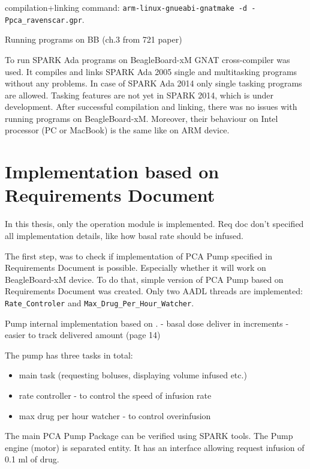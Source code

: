 compilation+linking command: \lstinline{arm-linux-gnueabi-gnatmake -d -Ppca_ravenscar.gpr}.


Running programs on BB (ch.3 from 721 paper)

To run SPARK Ada programs on BeagleBoard-xM GNAT cross-compiler was used. It compiles and links SPARK Ada 2005 single and multitasking programs without any problems. In case of SPARK Ada 2014 only single tasking programs are allowed. Tasking features are not yet in SPARK 2014, which is under development. After successful compilation and linking, there was no issues with running programs on BeagleBoard-xM. Moreover, their behaviour on Intel processor (PC or MacBook) is the same like on ARM device.


\section{Implementation based on Requirements Document}

In this thesis, only the operation module is implemented. Req doc don't specified all implementation details, like how basal rate should be infused.

The first step, was to check if implementation of PCA Pump specified in Requirements Document is possible. Especially whether it will work on BeagleBoard-xM device. To do that, simple version of PCA Pump based on Requirements Document was created. Only two AADL threads are implemented: \lstinline{Rate_Controler} and \lstinline{Max_Drug_Per_Hour_Watcher}.

Pump internal implementation based on \cite{CADD-PrizmAmbulatoryInfusionPump:Online}.
- basal dose deliver in increments - easier to track delivered amount (page 14)

The pump has three tasks in total:
\begin{itemize}
    \item main task (requesting boluses, displaying volume infused etc.)
    \item rate controller - to control the speed of infusion rate
    \item max drug per hour watcher - to control overinfusion
\end{itemize}

The main PCA Pump Package can be verified using SPARK tools. The Pump engine (motor) is separated entity. It has an interface allowing request infusion of 0.1 ml of drug.

